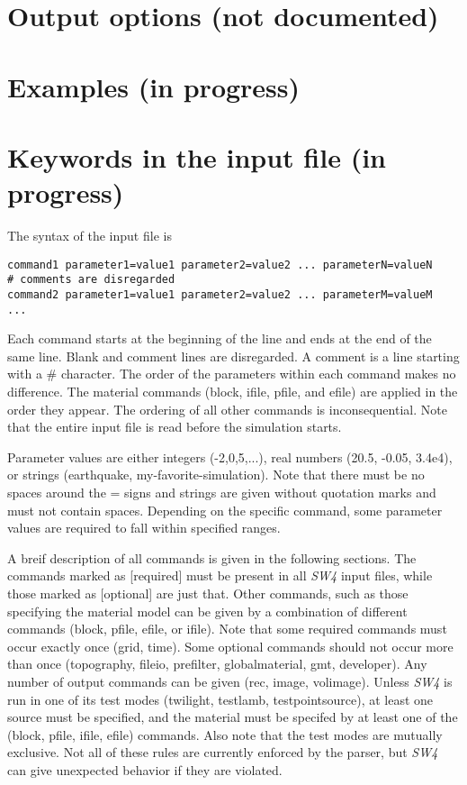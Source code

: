 \documentclass[11pt]{report}
\begin{document}
\chapter{Output options (not documented)}

\chapter{Examples (in progress)} \label{sec:examples}


\chapter{Keywords in the input file (in progress)}\label{chap:keywords}
The syntax of the input file is
\begin{verbatim}
command1 parameter1=value1 parameter2=value2 ... parameterN=valueN
# comments are disregarded
command2 parameter1=value1 parameter2=value2 ... parameterM=valueM
...
\end{verbatim}
Each command starts at the beginning of the line and ends at the end of the same line. Blank and
comment lines are disregarded. A comment is a line starting with a \# character. The order of the
parameters within each command makes no difference. The material commands (block, ifile, pfile, and efile)
are applied in the order they appear. The ordering of all other commands is inconsequential. Note
that the entire input file is read before the simulation starts.

Parameter values are either integers (-2,0,5,...), real numbers (20.5, -0.05, 3.4e4), or strings
(earthquake, my-favorite-simulation). Note that there must be no spaces around the = signs and
strings are given without quotation marks and must not contain spaces. Depending on the specific
command, some parameter values are required to fall within specified ranges.

A breif description of all commands is given in the following sections. The commands marked as
[required] must be present in all \emph{SW4} input files, while those marked as [optional] are just
that. Other commands, such as those specifying the material model can be given by a combination of
different commands (block, pfile, efile, or ifile). Note that some required commands must occur
exactly once (grid, time). Some optional commands should not occur more than once (topography,
fileio, prefilter, globalmaterial, gmt, developer). Any number of output commands can
be given (rec, image, volimage). Unless \emph{SW4} is run in one of its test modes (twilight,
testlamb, testpointsource), at least one source must be specified, and the material must be specifed
by at least one of the (block, pfile, ifile, efile) commands. Also note that the test modes are
mutually exclusive. Not all of these rules are currently enforced by the parser, but \emph{SW4} can
give unexpected behavior if they are violated.
\end{document}
